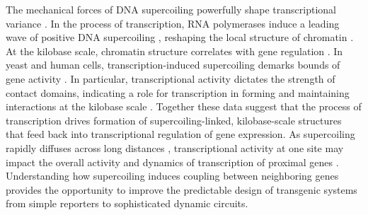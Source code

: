 \documentclass[11pt]{article} %
\begin{document}
The mechanical forces of DNA supercoiling powerfully shape transcriptional variance \parencite{desaiDNArepairPathwayCan2021,chongMechanismTranscriptionalBursting2014}.
In the process of transcription, RNA polymerases induce a leading wave of positive DNA supercoiling \parencite{wuTranscriptionGeneratesPositively1988,liuSupercoilingDNATemplate1987}, reshaping the local structure of chromatin \parencite{acharNegativeSupercoilGene2020,tevesTranscriptiongeneratedTorsionalStress2014,naughtonTranscriptionFormsRemodels2013,guoHighresolutionGenomewideMapping2021}.
At the kilobase scale, chromatin structure correlates with gene regulation \parencite{hsiehResolving3DLandscape2020,rowleyEvolutionarilyConservedPrinciples2017, krietensteinUltrastructuralDetailsMammalian2020}.
In yeast and human cells, transcription-induced supercoiling demarks bounds of gene activity \parencite{acharNegativeSupercoilGene2020,naughtonTranscriptionFormsRemodels2013,kouzineTranscriptiondependentDynamicSupercoiling2013}.
In particular, transcriptional activity dictates the strength of contact domains, indicating a role for transcription in forming and maintaining interactions at the kilobase scale \parencite{rowleyOrganizationalPrinciples3D2018,rowleyEvolutionarilyConservedPrinciples2017}.
Together these data suggest that the process of transcription drives formation of supercoiling-linked, kilobase-scale structures that feed back into transcriptional regulation of gene expression.
As supercoiling rapidly diffuses across long distances \parencite{loenhoutDynamicsDNASupercoils2012}, transcriptional activity at one site may impact the overall activity and dynamics of transcription of proximal genes \parencite{sevierPropertiesGeneExpression2018, sevierCollectivePolymeraseDynamics2022,tripathiDNASupercoilingmediatedCollective2021}.
Understanding how supercoiling induces coupling between neighboring genes provides the opportunity to improve the predictable design of transgenic systems from simple reporters to sophisticated dynamic circuits.

\end{document}
